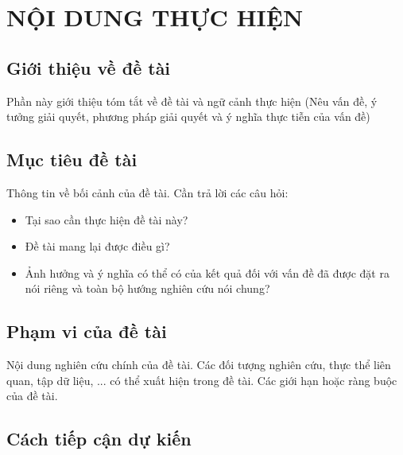 \documentclass{article}[14pt]
\begin{document}
    \section{NỘI DUNG THỰC HIỆN}
    {

    
    \subsection{Giới thiệu về đề tài}
    
    Phần này giới thiệu tóm tắt về đề tài và ngữ cảnh thực hiện (Nêu vấn đề, ý tưởng giải quyết, phương pháp giải quyết và ý nghĩa thực tiễn của vấn đề)
    
    
    \subsection{Mục tiêu đề tài}
    
    Thông tin về bối cảnh của đề tài. Cần trả lời các câu hỏi:
    \begin{itemize}
        \item Tại sao cần thực hiện đề tài này?
        \item Đề tài mang lại được điều gì?
        \item Ảnh hưởng và ý nghĩa có thể có của kết quả đối với vấn đề đã được đặt ra nói riêng và toàn bộ hướng nghiên cứu nói chung?
    \end{itemize}
    
    \subsection{Phạm vi của đề tài}
    
    Nội dung nghiên cứu chính của đề tài. Các đối tượng nghiên cứu, thực thể liên quan, tập dữ liệu, ... có thể xuất hiện trong đề tài. Các giới hạn hoặc ràng buộc của đề tài. 
    
    \subsection{Cách tiếp cận dự kiến}
        
}
\end{document}
